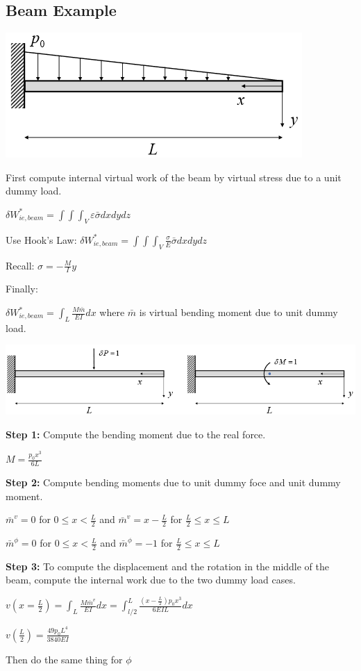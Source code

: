 \documentclass{article}
\begin{document}
\begin{multicols*}{2}
    \subsection*{Beam Example}\par 
    \includegraphics[width=0.5\linewidth]{Figures/Beam_Eample_VF.png}\par 
    First compute internal virtual work of the beam by virtual stress due to a unit dummy load.\par 
    $\delta W_{ie,beam}^*=\int \int \int_V \varepsilon\bar{\sigma}dxdydz$\par 
    Use Hook's Law: $\delta W_{ie,beam}^*=\int \int \int_V \frac{\sigma}{E}\bar{\sigma}dxdydz$\par 
    Recall: $\sigma = -\frac{M}{I}y$\par 
    Finally:\par 
    $\delta W_{ie,beam}^* = \int_L \frac{M\bar{m}}{EI}dx$ where $\bar{m}$ is
    virtual bending moment due to unit dummy load.

    \includegraphics[width=\linewidth]{Figures/Beam_Eample_VF_2.png}\par 
    \textbf{Step 1:} Compute the bending moment due to the real force.\par 
    $M = \frac{p_0 x^3}{6L}$\par 
    \textbf{Step 2:} Compute bending moments due to unit dummy foce and unit
    dummy moment.\par 
    $\bar{m}^v=0$ for $0 \le x < \frac{L}{2}$ and $\bar{m}^v = x - \frac{L}{2}$
    for $\frac{L}{2} \le x \le L$\par 
    $\bar{m}^\phi = 0$ for $0 \le x < \frac{L}{2}$ and $\bar{m}^\phi = -1$
    for $\frac{L}{2} \le x \le L$\par
    \textbf{Step 3:} To compute the displacement and the rotation in the middle
    of the beam, compute the internal work due to the two dummy load cases.\par 
    $v\left(x=\frac{L}{2}\right) = \int_L \frac{M\bar{m}^v}{EI}dx=\int_{l/2}^L \frac{(x-\frac{L}{2})p_0x^3}{6EIL}dx$\par 
    $v\left(\frac{L}{2}\right) = \frac{49p_0L^4}{3840EI}$\par 
    Then do the same thing for $\phi$


\end{multicols*}
\end{document}
